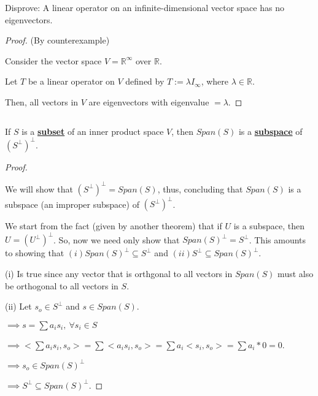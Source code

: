 \documentclass{article}
\newenvironment{customthm}[1]
  {\renewcommand\theinnercustomthm{#1}\innercustomthm}
  {\endinnercustomthm}
\begin{document}
\begin{customthm}{4}[2023.S(1.A.iv)]
  $ $

  Disprove: A linear operator on an infinite-dimensional vector space has no eigenvectors. 

\end{customthm}

\begin{proof}{(By counterexample)}
  $ $

  Consider the vector space $V = \mathbb{R}^\infty$ over $\mathbb{R}$.

  Let $T$ be a linear operator on $V$ defined by $T := \lambda I_\infty$, where $\lambda \in \mathbb{R}$.

  Then, all vectors in $V$ are eigenvectors with eigenvalue $= \lambda$.

  
\end{proof}
\newpage

\begin{customthm}{5}[2023.S(1.A.v)]
  $ $

  If $S$ is a \textbf{\underline{subset}} of an inner product space $V$, then $Span(S)$ is a \textbf{\underline{subspace}} of $(S^\perp)^\perp$.

\end{customthm}

\begin{proof}
  $ $

  We will show that $(S^\perp)^\perp = Span(S)$,  thus, concluding that $Span(S)$ is a subspace (an improper subspace) of $(S^\perp)^\perp$.
  \newline
  
  We start from the fact (given by another theorem) that if $U$ is a subspace, then $U = (U^\perp)^\perp$. So, now we need only show that $Span(S)^\perp = S^\perp$. This amounts to showing that $(i) Span(S)^\perp \subseteq S^\perp$ and $(ii) S^\perp \subseteq Span(S)^\perp$.
  \newline

  (i) Is true since any vector that is orthgonal to all vectors in $Span(S)$ must also be orthogonal to all vectors in $S$.
  \newline

  (ii) Let $s_o \in S^\perp$ and $s \in Span(S)$.

  \noindent
  $\implies s = \sum a_i s_i, \ \forall s_i \in S$

  \noindent
  $\implies <\sum a_i s_i, s_o> = \sum <a_i s_i, s_o> = \sum a_i <s_i, s_o> = \sum a_i * 0 = 0$.

  \noindent
  $\implies s_o \in Span(S)^\perp$

  \noindent
  $\implies S^\perp \subseteq Span(S)^\perp$.

\end{proof}
\newpage
\end{document}
